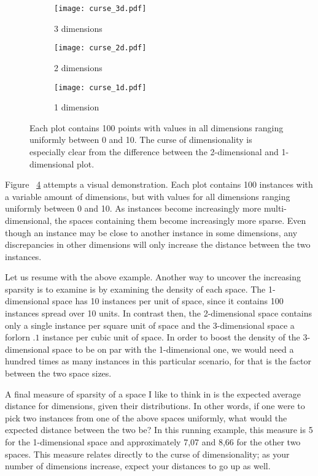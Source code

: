 \begin{figure}[ht]
\center

\begin{subfigure}{.49\textwidth}
  \centering
  \texttt{[image: curse\_3d.pdf]}
  \caption{3 dimensions}
  \label{fig.ml.cod3}
\end{subfigure}
\begin{subfigure}{.49\textwidth}
  \centering
  \texttt{[image: curse\_2d.pdf]}
  \caption{2 dimensions}
  \label{fig.ml.cod2}
\end{subfigure}
\begin{subfigure}{.45\textwidth}
  \centering
  \texttt{[image: curse\_1d.pdf]}
  \caption{1 dimension}
  \label{fig.ml.cod1}
\end{subfigure}

\caption{Each plot contains 100 points
with values in all dimensions ranging
uniformly between 0 and 10.
The curse of dimensionality is especially clear
from the difference between the 2-dimensional
and 1-dimensional plot.
}
\label{fig.ml.cod}
\end{figure}

Figure ~\ref{fig.ml.cod} attempts a visual demonstration.
Each plot contains 100 instances with a variable amount of dimensions,
but with values for all dimensions ranging uniformly between 0 and 10.
As instances become increasingly more multi-dimensional, %
the spaces containing them become increasingly more sparse.
Even though an instance may be close to another instance
in some dimensions,
any discrepancies in other dimensions
will only increase the distance between the two instances.

Let us resume with the above example.
Another way to uncover the increasing sparsity is to examine
is by examining the density of each space.
The 1-dimensional space has 10 instances per unit of space,
since it contains 100 instances spread over 10 units.
In contrast then, the 2-dimensional space contains
only a single instance per square unit of space
and the 3-dimensional space a forlorn $.1$ instance
per cubic unit of space.
In order to boost the density of the 3-dimensional space
to be on par with the 1-dimensional one,
we would need a hundred times as many instances
in this particular scenario,
for that is the factor between the two space sizes.

A final measure of sparsity of a space I like to think in
is the expected average distance for dimensions,
given their distributions.
In other words,
if one were to pick two instances from one of the above spaces uniformly,
what would the expected distance between the two be?
In this running example, %
this measure is 5 for the 1-dimensional space
and approximately 7,07 and 8,66 for the other
two spaces.
This measure relates directly to the curse of dimensionality;
as your number of dimensions increase,
expect your distances to go up as well.

